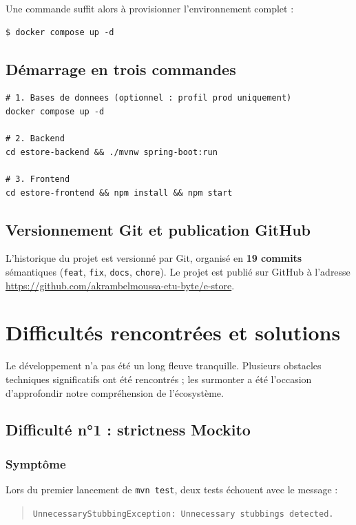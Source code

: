 \documentclass[11pt,a4paper,oneside]{report}
\begin{document}
Une commande suffit alors à provisionner l'environnement complet :

\begin{lstlisting}[style=shellstyle]
$ docker compose up -d
\end{lstlisting}

\section{Démarrage en trois commandes}

\begin{lstlisting}[style=shellstyle]
# 1. Bases de donnees (optionnel : profil prod uniquement)
docker compose up -d

# 2. Backend
cd estore-backend && ./mvnw spring-boot:run

# 3. Frontend
cd estore-frontend && npm install && npm start
\end{lstlisting}

\section{Versionnement Git et publication GitHub}

L'historique du projet est versionné par Git, organisé en
\textbf{19 commits} sémantiques (\texttt{feat}, \texttt{fix},
\texttt{docs}, \texttt{chore}). Le projet est publié sur GitHub à l'adresse
\url{https://github.com/akrambelmoussa-etu-byte/e-store}.

\chapter{Difficultés rencontrées et solutions}

Le développement n'a pas été un long fleuve tranquille. Plusieurs
obstacles techniques significatifs ont été rencontrés ; les surmonter a
été l'occasion d'approfondir notre compréhension de l'écosystème.

\section{Difficulté n°1 : strictness Mockito}

\subsection{Symptôme}
Lors du premier lancement de \texttt{mvn test}, deux tests échouent avec
le message :
\begin{quote}
\texttt{UnnecessaryStubbingException: Unnecessary stubbings detected.}
\end{quote}
\end{document}
